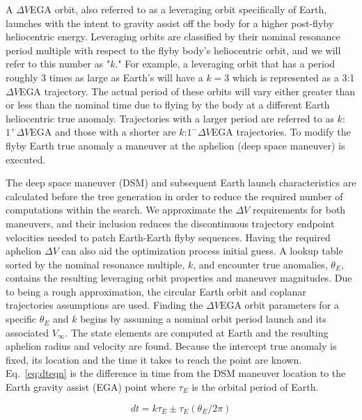 \documentclass[letterpaper, preprint, paper,11pt]{AAS}	%
\begin{document}
A $\Delta V$EGA orbit, also referred to as a leveraging orbit specifically of Earth, launches with the intent to gravity assist off the body for a higher post-flyby heliocentric energy\cite{Hollenbeck}. Leveraging orbits are classified by their nominal resonance period multiple with respect to the flyby body's heliocentric orbit, and we will refer to this number as "$k$." For example, a leveraging orbit that has a period roughly 3 times as large as Earth's will have a $k=3$ which is represented as a 3:1 $\Delta V$EGA trajectory. The actual period of these orbits will vary either greater than or less than the nominal time due to flying by the body at a different Earth heliocentric true anomaly. Trajectories with a larger period are referred to as $k$:$1^{+} \Delta V$EGA and those with a shorter are $k$:$1^{-} \Delta V$EGA trajectories. To modify the flyby Earth true anomaly a maneuver at the aphelion (deep space maneuver) is executed.

The deep space maneuver (DSM) and subsequent Earth launch characteristics are calculated before the tree generation in order to reduce the required number of computations within the search. We approximate the $\Delta V$ requirements for both maneuvers, and their inclusion reduces the discontinuous trajectory endpoint velocities needed to patch Earth-Earth flyby sequences. Having the required aphelion $\Delta V$ can also aid the optimization process initial guess. A lookup table sorted by the nominal resonance multiple, $k$, and encounter true anomalies, $\theta_{E}$, contains the resulting leveraging orbit properties and maneuver magnitudes. Due to being a rough approximation, the circular Earth orbit and coplanar trajectories assumptions are used. Finding the $\Delta V$EGA orbit parameters for a specific $\theta_{E}$ and $k$ begins by assuming a nominal orbit period launch and its associated $V_\infty$. The state elements are computed at Earth and the resulting aphelion radius and velocity are found. Because the intercept true anomaly is fixed, its location and the time it takes to reach the point are known. Eq.~\eqref{eq:dteqn} is the difference in time from the DSM maneuver location to the Earth gravity assist (EGA) point where $\tau_E$ is the orbital period of Earth.

\begin{equation}
	\label{eq:dteqn}
	dt = k\tau_E \pm \tau_E(\theta_E/2\pi)
\end{equation}
\end{document}
